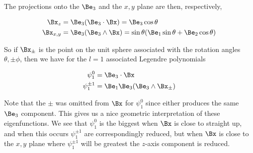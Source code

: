 The projections onto the $\Be_3$ and the $x,y$ plane are then, respectively,

\begin{align}\label{eqn:foob5}
\Bx_z &= \Be_3 (\Be_3 \cdot \Bx) = \Be_3 \cos\theta  \\
\Bx_{x,y} &= \Be_3 (\Be_3 \wedge \Bx) = \sin\theta (\Be_1 \sin\theta + \Be_2 \cos\theta) 
\end{align}

So if $\Bx_{\pm}$ is the point on the unit sphere associated with the rotation angles $\theta,\pm\phi$, then we have for the $l=1$ associated Legendre polynomials

\begin{align}\label{eqn:foob6}
\psi_1^0 &= \Be_3 \cdot \Bx \\
\psi_1^{\pm 1} &= \Be_1 \Be_3 (\Be_3 \wedge \Bx_{\pm})
\end{align}

Note that the $\pm$ was omitted from $\Bx$ for $\psi_1^0$ since either produces the same $\Be_3$ component.  This gives us a nice geometric interpretation of these eigenfunctions.  We see that $\psi_1^0$ is the biggest when $\Bx$ is close to straight up, and when this occurs $\psi_1^{\pm 1}$ are correspondingly reduced, but when $\Bx$ is close to the $x,y$ plane where $\psi_1^{\pm 1}$ will be greatest the $z$-axis component is reduced.

\EndArticle

